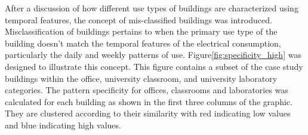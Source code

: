 After a discussion of how different use types of buildings are characterized using temporal features, the concept of mis-classified buildings was introduced. Misclassification of buildings pertains to when the primary use type of the building doesn't match the temporal features of the electrical consumption, particularly the daily and weekly patterns of use. Figure\ref{fig:specificity_high} was designed to illustrate this concept. This figure contains a subset of the case study buildings within the office, university classroom, and university laboratory categories. The pattern specificity for offices, classrooms and laboratories was calculated for each building as shown in the first three columns of the graphic. They are clustered according to their similarity with red indicating low values and blue indicating high values.